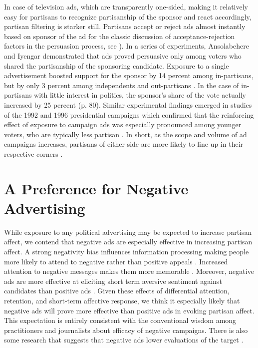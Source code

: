 \documentclass[12pt, letterpaper]{article}
\begin{document}
In case of television ads, which are transparently one-sided, making it relatively easy for partisans to recognize partisanship of the sponsor and react accordingly, partisan filtering is starker still. Partisans accept or reject ads almost instantly based on sponsor of the ad \citep{iyengar2008, mcguire1969} for the classic discussion of acceptance-rejection factors in the persuasion process, see \citealt{mcguire1985}). In a series of experiments, Ansolabehere and Iyengar demonstrated that ads proved persuasive only among voters who shared the partisanship of the sponsoring candidate.  Exposure to a single advertisement boosted support for the sponsor by 14 percent among in-partisans, but by only 3 percent among independents and out-partisans \citep[][p. 76]{ansolabehere1995}.  In the case of in-partisans with little interest in politics, the sponsor's share of the vote actually increased by 25 percent (p. 80). Similar experimental findings emerged in studies of the 1992 and 1996 presidential campaigns which confirmed that the reinforcing effect of exposure to campaign ads was especially pronounced among younger voters, who are typically less partisan \citep{iyengar2000a}.  In short, as the scope and volume of ad campaigns increases, partisans of either side are more likely to line up in their respective corners \citep[for a review see][]{iyengar2000b}.

\section*{A Preference for Negative Advertising}
While exposure to any political advertising may be expected to increase partisan affect, we contend that negative ads are especially effective in increasing partisan affect.  A strong negativity bias influences information processing \citep[see][]{soroka2012} making people more likely to attend to negative rather than positive appeals \citep{meffert2006}.  Increased attention to negative messages makes them more memorable \citep{lang1991, bradley2007, chang2001, newhagen1991}. Moreover, negative ads are more effective at eliciting short term aversive sentiment against candidates than positive ads \citep{chang2001}.  Given these effects of differential attention, retention, and short-term affective response, we think it especially likely that negative ads will prove more effective than positive ads in evoking partisan affect.  This expectation is entirely consistent with the conventional wisdom among practitioners and journalists about efficacy of negative campaigns. There is also some research that suggests that negative ads lower evaluations of the target \citep{gaines2011}.
\end{document}
